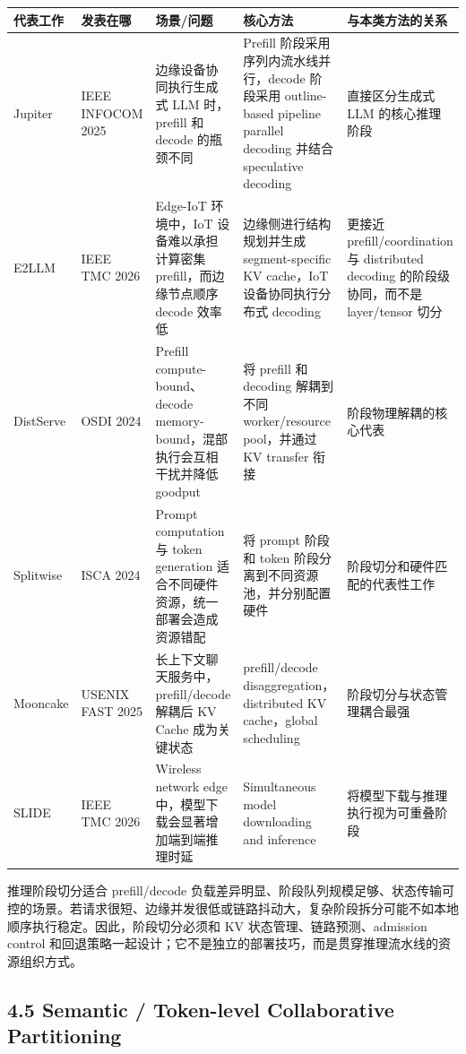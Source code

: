 \documentclass[a4paper,10pt]{ctexart}
\begin{document}
\begin{table}[H]
\centering
\scriptsize
\setlength{\tabcolsep}{3pt}
\renewcommand{\arraystretch}{1.15}
\begin{tabularx}{\textwidth}{|X|X|X|X|X|}
\hline
\textbf{代表工作} & \textbf{发表在哪} & \textbf{场景/问题} & \textbf{核心方法} & \textbf{与本类方法的关系} \\ \hline
Jupiter & IEEE INFOCOM 2025 & 边缘设备协同执行生成式 LLM 时，prefill 和 decode 的瓶颈不同 & Prefill 阶段采用序列内流水线并行，decode 阶段采用 outline-based pipeline parallel decoding 并结合 speculative decoding & 直接区分生成式 LLM 的核心推理阶段 \\ \hline
E2LLM & IEEE TMC 2026 & Edge-IoT 环境中，IoT 设备难以承担计算密集 prefill，而边缘节点顺序 decode 效率低 & 边缘侧进行结构规划并生成 segment-specific KV cache，IoT 设备协同执行分布式 decoding & 更接近 prefill/coordination 与 distributed decoding 的阶段级协同，而不是 layer/tensor 切分 \\ \hline
DistServe & OSDI 2024 & Prefill compute-bound、decode memory-bound，混部执行会互相干扰并降低 goodput & 将 prefill 和 decoding 解耦到不同 worker/resource pool，并通过 KV transfer 衔接 & 阶段物理解耦的核心代表 \\ \hline
Splitwise & ISCA 2024 & Prompt computation 与 token generation 适合不同硬件资源，统一部署会造成资源错配 & 将 prompt 阶段和 token 阶段分离到不同资源池，并分别配置硬件 & 阶段切分和硬件匹配的代表性工作 \\ \hline
Mooncake & USENIX FAST 2025 & 长上下文聊天服务中，prefill/decode 解耦后 KV Cache 成为关键状态 & prefill/decode disaggregation，distributed KV cache，global scheduling & 阶段切分与状态管理耦合最强 \\ \hline
SLIDE & IEEE TMC 2026 & Wireless network edge 中，模型下载会显著增加端到端推理时延 & Simultaneous model downloading and inference & 将模型下载与推理执行视为可重叠阶段 \\ \hline
\end{tabularx}
\end{table}




推理阶段切分适合 prefill/decode 负载差异明显、阶段队列规模足够、状态传输可控的场景。若请求很短、边缘并发很低或链路抖动大，复杂阶段拆分可能不如本地顺序执行稳定。因此，阶段切分必须和 KV 状态管理、链路预测、admission control 和回退策略一起设计；它不是独立的部署技巧，而是贯穿推理流水线的资源组织方式。


\subsection*{4.5 Semantic / Token-level Collaborative Partitioning}
\end{document}
